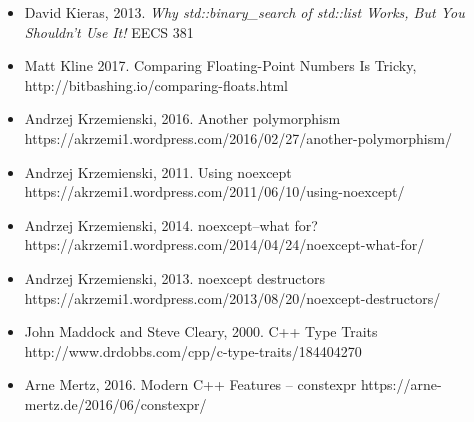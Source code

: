 \begin{itemize}

\item David Kieras, 2013. \textit{Why std::binary\_search of std::list Works, But You Shouldn’t Use} \textit{It!} EECS 381



\item Matt Kline 2017. Comparing Floating-Point Numbers Is Tricky, http://\allowbreak{}bitbashing.\allowbreak{}io/\allowbreak{}comparing-\allowbreak{}floats.\allowbreak{}html



\item Andrzej Krzemienski, 2016. Another polymorphism https://\allowbreak{}akrzemi1.\allowbreak{}wordpress.\allowbreak{}com/\allowbreak{}2016/\allowbreak{}02/\allowbreak{}27/\allowbreak{}another-\allowbreak{}polymorphism/



\item Andrzej Krzemienski, 2011. Using noexcept https://\allowbreak{}akrzemi1.\allowbreak{}wordpress.\allowbreak{}com/\allowbreak{}2011/\allowbreak{}06/\allowbreak{}10/\allowbreak{}using-\allowbreak{}noexcept/



\item Andrzej Krzemienski, 2014. noexcept--what for? https://\allowbreak{}akrzemi1.\allowbreak{}wordpress.\allowbreak{}com/\allowbreak{}2014/\allowbreak{}04/\allowbreak{}24/\allowbreak{}noexcept-\allowbreak{}what-\allowbreak{}for/



\item Andrzej Krzemienski, 2013. noexcept destructors https://\allowbreak{}akrzemi1.\allowbreak{}wordpress.\allowbreak{}com/\allowbreak{}2013/\allowbreak{}08/\allowbreak{}20/\allowbreak{}noexcept-\allowbreak{}destructors/



\item John Maddock and Steve Cleary, 2000. C++ Type Traits http://\allowbreak{}www.\allowbreak{}drdobbs.\allowbreak{}com/\allowbreak{}cpp/\allowbreak{}c-\allowbreak{}type-\allowbreak{}traits/\allowbreak{}184404270



\item Arne Mertz, 2016. Modern C++ Features – constexpr https://\allowbreak{}arne-\allowbreak{}mertz.\allowbreak{}de/\allowbreak{}2016/\allowbreak{}06/\allowbreak{}constexpr/



\end{itemize}
